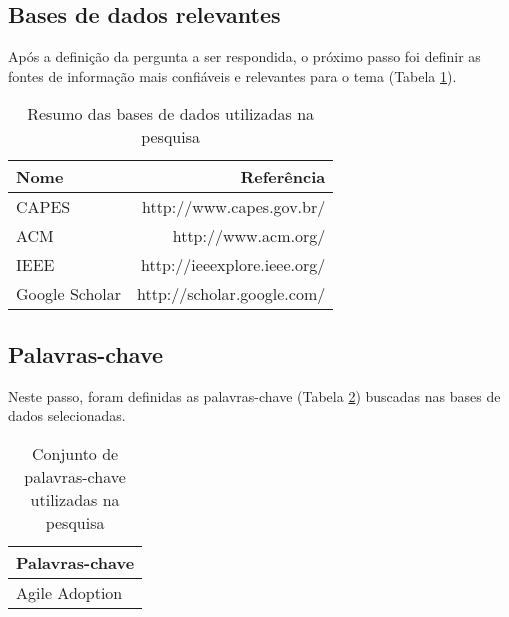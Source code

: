 		\subsection{Bases de dados relevantes}
			Após a definição da pergunta a ser respondida, o próximo passo foi definir as fontes de informação mais confiáveis e relevantes para o tema (Tabela \ref{tab:basesDeDados}).
			\begin{table}[H]
				\centering
				\begin{tabular}{| l | r |} \hline \textbf{Nome} & \textbf{Referência} \\ \hline
					CAPES & http://www.capes.gov.br/ \\ \hline
					ACM & http://www.acm.org/ \\ \hline
					IEEE & http://ieeexplore.ieee.org/ \\ \hline
					Google Scholar & http://scholar.google.com/ \\ \hline
				\end{tabular}
				\caption{Resumo das bases de dados utilizadas na pesquisa}
				\label{tab:basesDeDados}
			\end{table}
		\subsection{Palavras-chave}
			Neste passo, foram definidas as palavras-chave (Tabela \ref{tab:palavrasChave}) buscadas nas bases de dados selecionadas.
			\begin{table}[H]
				\centering
				\begin{tabular}{| l |} \hline \textbf{Palavras-chave} \\ \hline
					Agile Adoption \\ \hline
				\end{tabular}
				\caption{Conjunto de palavras-chave utilizadas na pesquisa}
				\label{tab:palavrasChave}
			\end{table}
